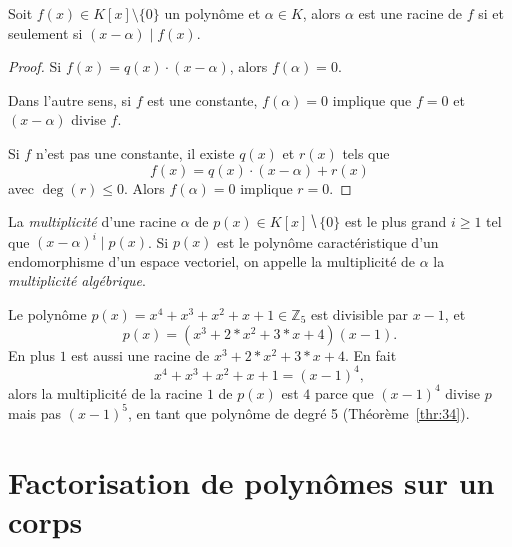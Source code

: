 \begin{theorem}
  \label{thr:35}
  Soit $f(x)∈ K[x] \setminus \{0\}$ un polynôme  et $\alpha \in K$, alors $\alpha$ est une racine de $f$ si et seulement si $(x- \alpha)  \mid f(x)$. 
\end{theorem}

\begin{proof}
  Si $f(x) = q(x) \cdot (x - \alpha)$, alors $f(\alpha) = 0$. 

Dans l'autre sens, si $f$ est une constante, $f(\alpha) = 0$ implique que $f = 0$ et $(x - \alpha)$ divise $f$. 

Si $f$ n'est pas une constante, il existe $q(x)$ et $r(x)$ tels que
\begin{displaymath}
  f(x) = q(x) \cdot (x - \alpha) + r(x)
\end{displaymath}
avec $\deg(r) \leq 0$. Alors $f(\alpha) = 0$ implique $r=0$. 
\end{proof}


\begin{definition}
  \label{def:41}
  La \emph{multiplicité} d'une racine $α$ de $p(x) ∈ K[x] ⧹\{0\}$ est le plus grand $i≥1$ tel que $ (x-α)^i \mid p(x)$. Si $p(x)$ est le polynôme caractéristique d'un endomorphisme d'un espace vectoriel, on appelle la multiplicité de $α$ la \emph{multiplicité algébrique}. 
\end{definition} 


\begin{example}  
  \label{exe:45}
  Le polynôme  $p(x) = x^4 + x^3 + x^2 + x + 1  ∈ℤ_5$  est divisible par $x-1$, et
  \begin{displaymath}
    p(x)  = (x^3 + 2*x^2 + 3*x + 4)  (x-1). 
  \end{displaymath}
  En plus $1$ est aussi une racine de $x^3 + 2*x^2 + 3*x + 4$. En fait 
  \begin{displaymath}
    x^4 + x^3 + x^2 + x + 1 = (x-1)^4,
  \end{displaymath}
  alors la multiplicité de la racine $1$ de $p(x)$ est $4$ parce que $(x-1)^4$ divise $p$ mais pas $(x-1)^5$, en tant que polynôme de degré 5 (Théorème~\ref{thr:34}).   
\end{example}


\section{Factorisation de polynômes sur un corps}
\label{sec:fact-de-polyn}

